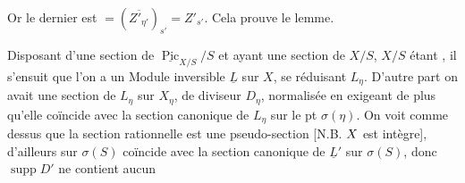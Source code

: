 Or le dernier est $=(\overline{Z'_{\eta'}})_{s'}=Z'_{s'}$. Cela prouve le lemme.

Disposant d'une section de $\underline{\operatorname{Pic}}_{X/S}/S$ et ayant une section de $X/S$, $X/S$ étant , il s'ensuit que l'on a un Module inversible $\underline L$ sur $X$, se réduisant  $L_\eta$. D'autre part on avait  une section de $L_\eta$ sur $X_\eta$, de diviseur $D_\eta$, normalisée en exigeant de plus qu'elle coïncide avec la section canonique de $L_\eta$ sur le pt $\sigma(\eta)$. On voit comme dessus que la section  rationnelle est une pseudo-section [N.B. $X$ est intègre],  d'ailleurs sur $\sigma(S)$   coïncide avec la section canonique de $\underline L'$ sur $\sigma(S)$, donc  $\operatorname{supp}D'$ ne contient aucun
